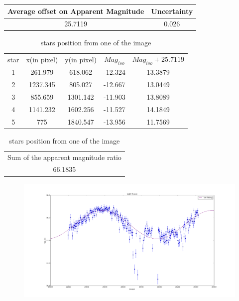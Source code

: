 \documentclass[10pt,journal,compsoc]{IEEEtran}
\begin{document}
\begin{table}[h!]
\centering
\begin{tabular}{|c c|}
\hline
Average offset on Apparent Magnitude & Uncertainty \\  [1 ex] \hline\hline
25.7119 & 0.026 \\ [1ex]\hline
\end{tabular}
\end{table}
\begin{table}[h!]
\centering
\caption{stars position from one of the image}
\begin{tabular}{||c c c c c ||} 
 \hline 
 star & x(in pixel) & y(in pixel) & $Mag_{iso}$ & $Mag_{iso}+25.7119$ \\ [1ex]
 1 & 261.979 & 618.062 & -12.324 &13.3879\\
 2 & 1237.345 & 805.027 & -12.667 & 13.0449\\
 3 & 855.659 & 1301.142 & -11.903 & 13.8089\\
 4 & 1141.232 & 1602.256 & -11.527 & 14.1849\\
 5 & 775 & 1840.547 & -13.956 & 11.7569 \\[1ex] 
 \hline
\end{tabular}
\begin{tabular}{|| c||} 
 \hline
 Sum of the apparent magnitude ratio \\[1ex]
66.1835
\\[1ex] 
 \hline
\end{tabular}
\end{table}
\begin{figure}
\label{figure 1 - apparent magnitude vs time}
\includegraphics[scale=0.3]{fitted_plot.png}
\end{figure}
\end{document}
